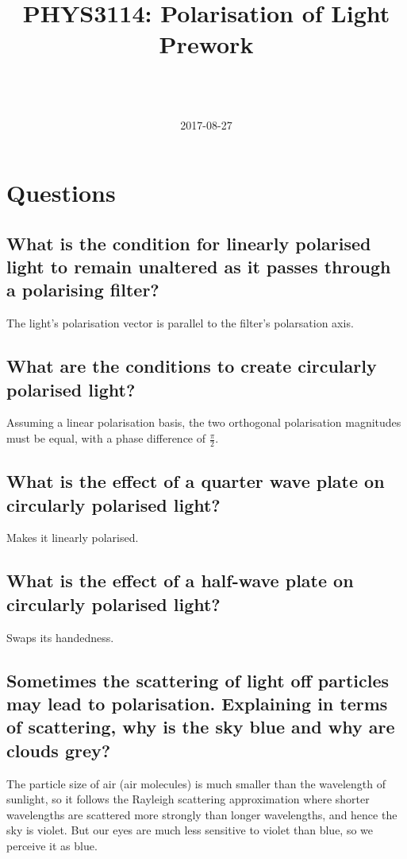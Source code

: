 \documentclass[a4paper]{scrartcl}
\begin{document}
\title{PHYS3114: Polarisation of Light Prework}
\author{ \\ \\ }
\date{2017-08-27}
\maketitle

\section{Questions}
\subsection{What is the condition for linearly polarised light to remain unaltered as it passes through a polarising filter?}
The light's polarisation vector is parallel to the filter's polarsation axis.

\subsection{What are the conditions to create circularly polarised light?}
Assuming a linear polarisation basis, the two orthogonal polarisation magnitudes must be equal, with a phase difference of \(\frac{\pi}{2}\).

\subsection{What is the effect of a quarter wave plate on circularly polarised light?}
Makes it linearly polarised.

\subsection{What is the effect of a half-wave plate on circularly polarised light?}
Swaps its handedness.

\subsection{Sometimes the scattering of light off particles may lead to polarisation. Explaining in terms of scattering, why is the sky blue and why are clouds grey?}
The particle size of air (air molecules) is much smaller than the wavelength of sunlight, so it follows the Rayleigh scattering approximation where shorter wavelengths are scattered more strongly than longer wavelengths, and hence the sky is violet. But our eyes are much less sensitive to violet than blue, so we perceive it as blue.
\end{document}
